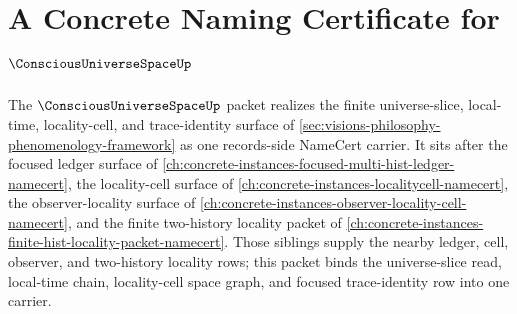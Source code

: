 \chapter{A Concrete Naming Certificate for $\ConsciousUniverseSpaceUp$}
\label{ch:concrete-instances-consciousuniversespace-namecert}

The $\ConsciousUniverseSpaceUp$ packet realizes the finite universe-slice, local-time, locality-cell, and trace-identity surface of \autoref{sec:visions-philosophy-phenomenology-framework} as one records-side NameCert carrier. It sits after the focused ledger surface of \autoref{ch:concrete-instances-focused-multi-hist-ledger-namecert}, the locality-cell surface of \autoref{ch:concrete-instances-localitycell-namecert}, the observer-locality surface of \autoref{ch:concrete-instances-observer-locality-cell-namecert}, and the finite two-history locality packet of \autoref{ch:concrete-instances-finite-hist-locality-packet-namecert}. Those siblings supply the nearby ledger, cell, observer, and two-history locality rows; this packet binds the universe-slice read, local-time chain, locality-cell space graph, and focused trace-identity row into one carrier.

